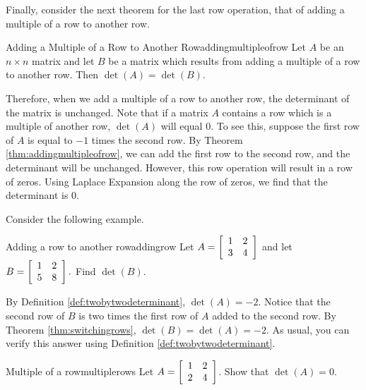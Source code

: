 Finally, consider the next theorem for the last row operation, that of adding a multiple of a row
to another row. 

\begin{theorem}{Adding a Multiple of a Row to Another Row}{addingmultipleofrow}
Let $A$ be an $n\times n$ matrix and let $B$ be a matrix
which results from adding a multiple of a row to another row.
 Then $\det \left( A\right) =\det
\left( B \right) $.
\end{theorem}

Therefore, when we add a multiple of a row to another row, the determinant of the matrix is unchanged. 
Note that if a matrix $A$ contains a row which is a multiple of another row, $\det \left(A\right)$ will equal $0$. To see this,
suppose the first row of $A$ is equal to $-1$ times the second row. By Theorem \ref{thm:addingmultipleofrow}, we can 
add the first row to the second row, and the determinant will be unchanged. However, this row operation will result in a row of zeros.
Using Laplace Expansion along the row of zeros, we find that the determinant is $0$. 

Consider the following example.

\begin{example}{Adding a row to another row}{addingrow}
Let $A=\left[
\begin{array}{rr}
1 & 2 \\
3 & 4
\end{array}
\right] $ and let $B=\left[
\begin{array}{rr}
1 & 2 \\
5 & 8
\end{array}
\right] .$ 
Find $\det \left(B\right)$.
\end{example}

\begin{solution}
By Definition \ref{def:twobytwodeterminant}, $\det \left(A\right) = -2$. 
Notice that the second row of $B$ is two times the first row of $A$ added
to the second row. 
By Theorem \ref{thm:switchingrows}, $\det \left( B\right) = \det \left( A \right)
=-2$.
As usual, you can verify this answer using Definition \ref{def:twobytwodeterminant}.
\end{solution}

\begin{example}{Multiple of a row}{multiplerows}
Let $A = \left[ \begin{array}{rr}
1 & 2 \\
2 & 4 
\end{array} \right]$. Show that $\det \left( A \right) = 0$. 
\end{example}

